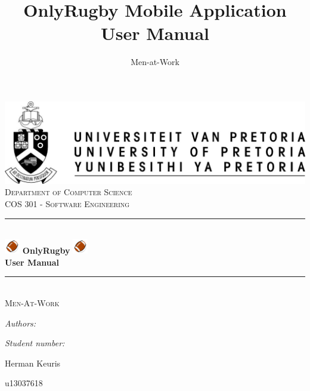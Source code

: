 \documentclass[hidelinks,a4paper,12pt]{article}
\author{Men-at-Work}
\title{ OnlyRugby Mobile Application User Manual}
\newcommand{\HRule}{\rule{\linewidth}{0.5mm}}
\begin{document}
\setlength{\parskip}{6pt}

\begin{titlepage}

\begin{center}
\includegraphics[width=1\textwidth]{./images/up-logo.jpg}\\[0.4cm]    
\textsc{\LARGE Department of Computer Science}\\[1.5cm]
\textsc{\Large COS 301 - Software Engineering}\\[0.5cm]
\HRule \\[0.4cm]
\includegraphics[width=0.05\textwidth]{./images/logo.png} 
{ \huge \bfseries OnlyRugby}
\includegraphics[width=0.05\textwidth]{./images/logo.png}\\[0.4cm] 
{ \huge \bfseries User Manual}\\[0.4cm]
\HRule \\[0.4cm]
\textsc{\Large Men-At-Work}\\[0.5cm]
\begin{minipage}{0.4\textwidth}
\begin{flushleft} \large
\emph{Authors:}
\end{flushleft}
\end{minipage}
\begin{minipage}{0.4\textwidth}
\begin{flushright} \large
\emph{Student number:}
\end{flushright}
\end{minipage}

\begin{minipage}{0.4\textwidth}
\begin{flushleft} \large
Herman {Keuris}
\end{flushleft}
\end{minipage}
\begin{minipage}{0.4\textwidth}
\begin{flushright} \large
\emph{}
u13037618
\end{flushright}
\end{minipage}


\end{center}
\end{titlepage}
\end{document}
